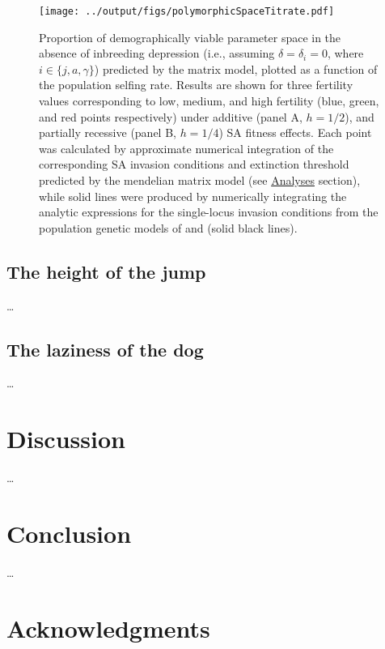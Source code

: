 \documentclass[11pt]{article}
\begin{document}
 \begin{figure}[htbp]
 \centering
 \texttt{[image: ../output/figs/polymorphicSpaceTitrate.pdf]}
 \caption{Proportion of demographically viable parameter space in the absence of inbreeding depression (i.e., assuming $\delta = \delta_i = 0$, where $i \in \{j,a,\gamma\}$) predicted by the matrix model, plotted as a function of the population selfing rate. Results are shown for three fertility values corresponding to low, medium, and high fertility (blue, green, and red points respectively) under additive (panel A, $h = 1/2$), and partially recessive (panel B, $h = 1/4$) SA fitness effects. Each point was calculated by approximate numerical integration of the corresponding SA invasion conditions and extinction threshold predicted by the mendelian matrix model (see \hyperref[sec:analyses]{Analyses} section), while solid lines were produced by numerically integrating the analytic expressions for the single-locus invasion conditions from the population genetic models of \citet{JordanConnallon2014} and \citet{Olito2017} (solid black lines). } 
 \label{fig:polySpace}
 \end{figure}

\subsection*{The height of the jump}

\ldots

\subsection*{The laziness of the dog}

\ldots

\section*{Discussion}

\ldots

\section*{Conclusion}

\ldots


\section*{Acknowledgments}
\end{document}
